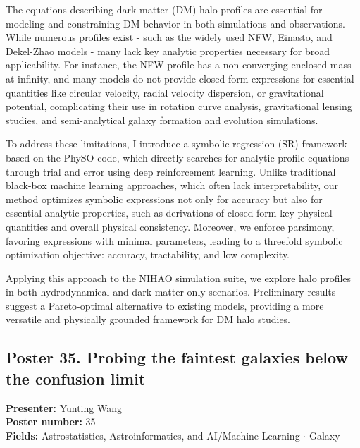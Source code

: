 The equations describing dark matter (DM) halo profiles are essential for modeling and constraining DM behavior in both simulations and observations. While numerous profiles exist - such as the widely used NFW, Einasto, and Dekel-Zhao models - many lack key analytic properties necessary for broad applicability. For instance, the NFW profile has a non-converging enclosed mass at infinity, and many models do not provide closed-form expressions for essential quantities like circular velocity, radial velocity dispersion, or gravitational potential, complicating their use in rotation curve analysis, gravitational lensing studies, and semi-analytical galaxy formation and evolution simulations.

To address these limitations, I introduce a symbolic regression (SR) framework based on the PhySO code, which directly searches for analytic profile equations through trial and error using deep reinforcement learning. Unlike traditional black-box machine learning approaches, which often lack interpretability, our method optimizes symbolic expressions not only for accuracy but also for essential analytic properties, such as derivations of closed-form key physical quantities and overall physical consistency. Moreover, we enforce parsimony, favoring expressions with minimal parameters, leading to a threefold symbolic optimization objective: accuracy, tractability, and low complexity.

Applying this approach to the NIHAO simulation suite, we explore halo profiles in both hydrodynamical and dark-matter-only scenarios. Preliminary results suggest a Pareto-optimal alternative to existing models, providing a more versatile and physically grounded framework for DM halo studies.

\hypertarget{poster-abstract-talk-323}{}\label{poster-abstract-page-talk-323}
\subsection*{Poster 35. Probing the faintest galaxies below the confusion limit}
\textbf{Presenter:} Yunting Wang\\
\textbf{Poster number:} 35\\
\textbf{Fields:} Astrostatistics, Astroinformatics, and AI/Machine Learning $\cdot$ Galaxy

